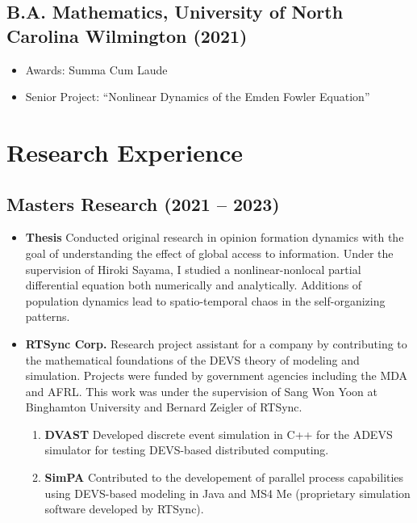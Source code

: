 \documentclass[12pt]{article}
\begin{document}
\subsection{\textbf{B.A. Mathematics}, University of North Carolina Wilmington \hfill (2021)}
\begin{itemize}
    \itemsep = 0em
    \item[] Awards: Summa Cum Laude
    \item[] Senior Project: ``Nonlinear Dynamics of the Emden Fowler Equation''
\end{itemize}


\section{Research Experience}

\subsection{\textbf{Masters Research} \hfill (2021 -- 2023)}
\begin{itemize}
    \itemsep = 0em
    \item \textbf{Thesis} Conducted original research in opinion formation dynamics with the goal of understanding the effect of global access to information. Under the supervision of Hiroki Sayama, I studied a nonlinear-nonlocal partial differential equation both numerically and analytically. Additions of population dynamics lead to spatio-temporal chaos in the self-organizing patterns.
    \item \textbf{RTSync Corp.} Research project assistant for a company by contributing to the mathematical foundations of the DEVS theory of modeling and simulation. Projects were funded by government agencies including the MDA and AFRL. This work was under the supervision of Sang Won Yoon at Binghamton University and Bernard Zeigler of RTSync.
    \begin{enumerate}
        \itemsep = 0em
        \item \textbf{DVAST} Developed discrete event simulation in C++ for the ADEVS simulator for testing DEVS-based distributed computing.
        \item \textbf{SimPA} Contributed to the developement of parallel process capabilities using DEVS-based modeling in Java and MS4 Me (proprietary simulation software developed by RTSync).
    \end{enumerate}
\end{itemize}
\end{document}

